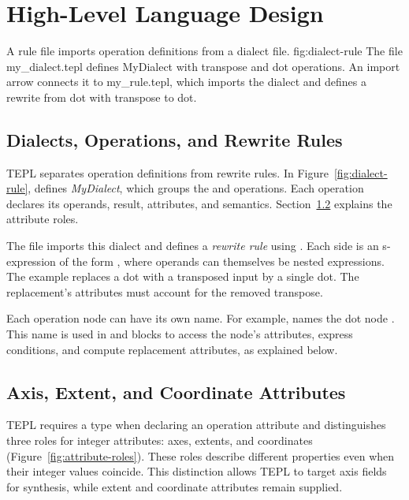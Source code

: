 \section{High-Level Language Design}
\label{sec:language}

  {A rule file imports operation definitions from a dialect file.}
  {fig:dialect-rule}
  {The file my_dialect.tepl defines MyDialect with transpose and dot operations. An import arrow connects it to my_rule.tepl, which imports the dialect and defines a rewrite from dot with transpose to dot.}

\subsection{Dialects, Operations, and Rewrite Rules}
\label{sec:dialects}
TEPL separates operation definitions from rewrite rules.
In Figure~\ref{fig:dialect-rule},  defines
\emph{MyDialect}, which groups the  and 
operations. Each operation declares its operands, result, attributes,
and semantics. Section~\ref{sec:attribute-roles} explains the attribute roles.

The file  imports this dialect and defines a
\emph{rewrite rule} using .
Each side is an s-expression of the form ,
where operands can themselves be nested expressions.
The example replaces a dot with a transposed input by a single dot.
The replacement's attributes must account for the removed transpose.

Each operation node can have its own name.
For example,  names the dot node .
This name is used in  and  blocks to access
the node's attributes, express conditions, and compute replacement
attributes, as explained below.

\subsection{Axis, Extent, and Coordinate Attributes}
\label{sec:attribute-roles}

TEPL requires a type when declaring an operation attribute and distinguishes
three roles for integer attributes: axes, extents, and coordinates
(Figure~\ref{fig:attribute-roles}). These roles describe different properties
even when their integer values coincide. This distinction allows TEPL to
target axis fields for synthesis, while extent and coordinate
attributes remain supplied.

